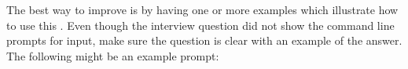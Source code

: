
\begin{answer}{6}
The best way to improve \cry{} is by having one or more examples which illustrate how to use this \cf. Even though the interview question did not show the command line prompts for input, make sure the question is clear with an example of the answer. The following might be an example prompt:
\end{answer}

